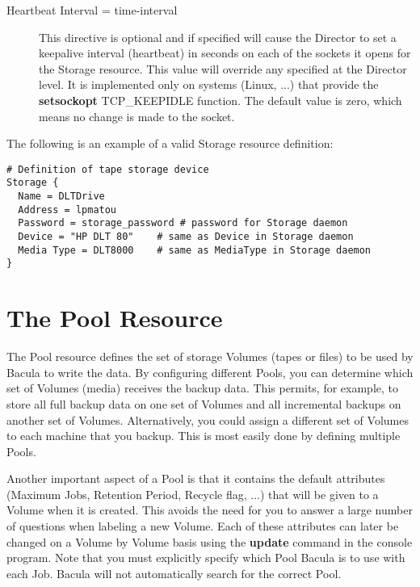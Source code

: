 \begin{description}
\item [Heartbeat Interval = \lt{}time-interval\gt{}]
   This directive is optional and if specified will cause the Director to
   set a keepalive interval (heartbeat) in seconds on each of the sockets
   it opens for the Storage resource.  This value will override any
   specified at the Director level.  It is implemented only on systems
   (Linux, ...) that provide the {\bf setsockopt} TCP\_KEEPIDLE function.
   The default value is zero, which means no change is made to the socket.

\end{description}

The following is an example of a valid Storage resource definition: 

\footnotesize
\begin{verbatim}
# Definition of tape storage device
Storage {
  Name = DLTDrive
  Address = lpmatou
  Password = storage_password # password for Storage daemon
  Device = "HP DLT 80"    # same as Device in Storage daemon
  Media Type = DLT8000    # same as MediaType in Storage daemon
}
\end{verbatim}
\normalsize

\section{The Pool Resource}
\label{PoolResource}

The Pool resource defines the set of storage Volumes (tapes or files) to be
used by Bacula to write the data. By configuring different Pools, you can
determine which set of Volumes (media) receives the backup data. This permits,
for example, to store all full backup data on one set of Volumes and all
incremental backups on another set of Volumes. Alternatively, you could assign
a different set of Volumes to each machine that you backup. This is most
easily done by defining multiple Pools. 

Another important aspect of a Pool is that it contains the default attributes
(Maximum Jobs, Retention Period, Recycle flag, ...) that will be given to a
Volume when it is created. This avoids the need for you to answer a large
number of questions when labeling a new Volume. Each of these attributes can
later be changed on a Volume by Volume basis using the {\bf update} command in
the console program. Note that you must explicitly specify which Pool Bacula
is to use with each Job. Bacula will not automatically search for the correct
Pool. 

